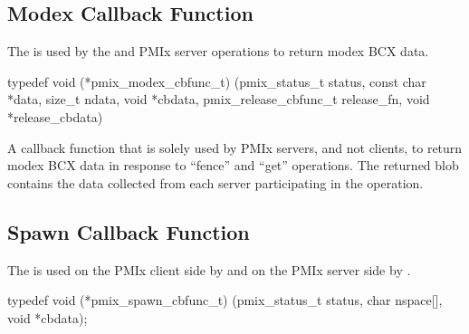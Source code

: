 \subsection{Modex Callback Function}

\summary

The  is used by the  and  PMIx server operations to return modex \ac{BCX} data.

\cspecificstart
\begin{codepar}
typedef void (*pmix_modex_cbfunc_t)
    (pmix_status_t status,
     const char *data, size_t ndata,
     void *cbdata,
     pmix_release_cbfunc_t release_fn,
     void *release_cbdata)
\end{codepar}
\cspecificend

\begin{arglist}
\end{arglist}

\descr

A callback function that is solely used by PMIx servers, and not clients, to return modex \ac{BCX} data in response to ``fence'' and ``get'' operations.
The returned blob contains the data collected from each server participating in the operation.



\subsection{Spawn Callback Function}

\summary

The  is used on the PMIx client side by  and on the PMIx server side by .

\cspecificstart
\begin{codepar}
typedef void (*pmix_spawn_cbfunc_t)
    (pmix_status_t status,
     char nspace[], void *cbdata);
\end{codepar}
\cspecificend

